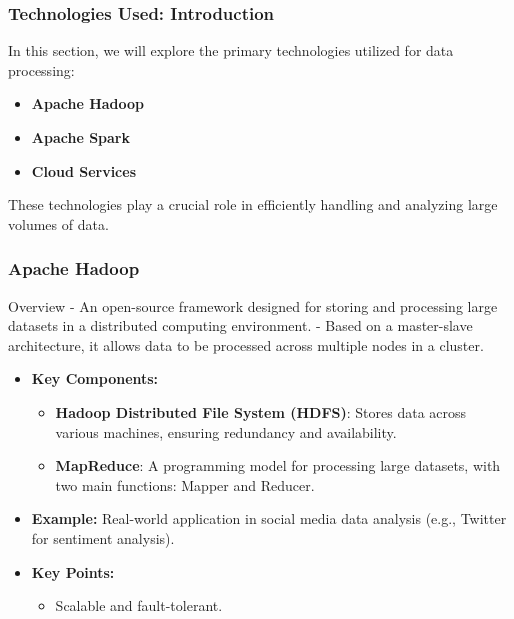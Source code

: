 \documentclass{beamer}
\begin{document}
\begin{frame}[fragile]
    \frametitle{Technologies Used: Introduction}
    In this section, we will explore the primary technologies utilized for data processing:
    \begin{itemize}
        \item \textbf{Apache Hadoop}
        \item \textbf{Apache Spark}
        \item \textbf{Cloud Services}
    \end{itemize}
    These technologies play a crucial role in efficiently handling and analyzing large volumes of data.
\end{frame}

\begin{frame}[fragile]
    \frametitle{Apache Hadoop}
    \begin{block}{Overview}
        - An open-source framework designed for storing and processing large datasets in a distributed computing environment.
        - Based on a master-slave architecture, it allows data to be processed across multiple nodes in a cluster.
    \end{block}
    
    \begin{itemize}
        \item \textbf{Key Components:}
        \begin{itemize}
            \item \textbf{Hadoop Distributed File System (HDFS)}: Stores data across various machines, ensuring redundancy and availability.
            \item \textbf{MapReduce}: A programming model for processing large datasets, with two main functions: Mapper and Reducer.
        \end{itemize}
        
        \item \textbf{Example:} Real-world application in social media data analysis (e.g., Twitter for sentiment analysis).
        
        \item \textbf{Key Points:} 
        \begin{itemize}
            \item Scalable and fault-tolerant.
        \end{itemize}
    \end{itemize}
\end{frame}
\end{document}
